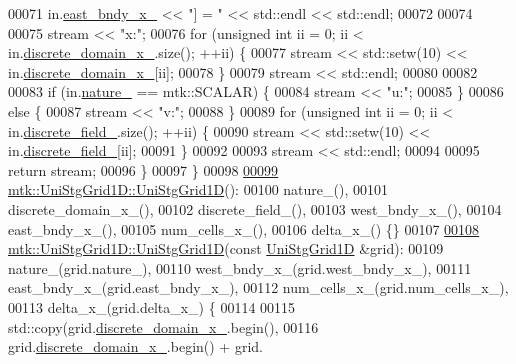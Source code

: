 \begin{DoxyCode}
00071   in.\hyperlink{classmtk_1_1UniStgGrid1D_a69a7d6be3171e53177e476348d04f4ae}{east\_bndy\_x\_} << \textcolor{stringliteral}{"] = "} << std::endl << std::endl;
00072 
00074 
00075   stream << \textcolor{stringliteral}{"x:"};
00076   \textcolor{keywordflow}{for} (\textcolor{keywordtype}{unsigned} \textcolor{keywordtype}{int} ii = 0; ii < in.\hyperlink{classmtk_1_1UniStgGrid1D_a0a1f9c00e21659e05f414dd97e2a52e3}{discrete\_domain\_x\_}.size(); ++ii) \{
00077     stream << std::setw(10) << in.\hyperlink{classmtk_1_1UniStgGrid1D_a0a1f9c00e21659e05f414dd97e2a52e3}{discrete\_domain\_x\_}[ii];
00078   \}
00079   stream << std::endl;
00080 
00082 
00083   \textcolor{keywordflow}{if} (in.\hyperlink{classmtk_1_1UniStgGrid1D_a061b66c92532b1498ce0e15418754911}{nature\_} == mtk::SCALAR) \{
00084     stream << \textcolor{stringliteral}{"u:"};
00085   \}
00086   \textcolor{keywordflow}{else} \{
00087     stream << \textcolor{stringliteral}{"v:"};
00088   \}
00089   \textcolor{keywordflow}{for} (\textcolor{keywordtype}{unsigned} \textcolor{keywordtype}{int} ii = 0; ii < in.\hyperlink{classmtk_1_1UniStgGrid1D_a7379a5c6d16210cdd61ffa731bc47edc}{discrete\_field\_}.size(); ++ii) \{
00090     stream << std::setw(10) << in.\hyperlink{classmtk_1_1UniStgGrid1D_a7379a5c6d16210cdd61ffa731bc47edc}{discrete\_field\_}[ii];
00091   \}
00092 
00093   stream << std::endl;
00094 
00095   \textcolor{keywordflow}{return} stream;
00096 \}
00097 \}
00098 
\hypertarget{mtk__uni__stg__grid__1d_8cc_source_l00099}{}\hyperlink{classmtk_1_1UniStgGrid1D_ab0c1bb8afad2420fdb4434eb21bdec82}{00099} \hyperlink{classmtk_1_1UniStgGrid1D_ab0c1bb8afad2420fdb4434eb21bdec82}{mtk::UniStgGrid1D::UniStgGrid1D}():
00100     nature\_(),
00101     discrete\_domain\_x\_(),
00102     discrete\_field\_(),
00103     west\_bndy\_x\_(),
00104     east\_bndy\_x\_(),
00105     num\_cells\_x\_(),
00106     delta\_x\_() \{\}
00107 
\hypertarget{mtk__uni__stg__grid__1d_8cc_source_l00108}{}\hyperlink{classmtk_1_1UniStgGrid1D_a56d698e803070d96601b46f470bfef0b}{00108} \hyperlink{classmtk_1_1UniStgGrid1D_ab0c1bb8afad2420fdb4434eb21bdec82}{mtk::UniStgGrid1D::UniStgGrid1D}(\textcolor{keyword}{const} 
      \hyperlink{classmtk_1_1UniStgGrid1D}{UniStgGrid1D} &grid):
00109     nature\_(grid.nature\_),
00110     west\_bndy\_x\_(grid.west\_bndy\_x\_),
00111     east\_bndy\_x\_(grid.east\_bndy\_x\_),
00112     num\_cells\_x\_(grid.num\_cells\_x\_),
00113     delta\_x\_(grid.delta\_x\_) \{
00114 
00115     std::copy(grid.\hyperlink{classmtk_1_1UniStgGrid1D_a0a1f9c00e21659e05f414dd97e2a52e3}{discrete\_domain\_x\_}.begin(),
00116               grid.\hyperlink{classmtk_1_1UniStgGrid1D_a0a1f9c00e21659e05f414dd97e2a52e3}{discrete\_domain\_x\_}.begin() + grid.

\end{DoxyCode}
